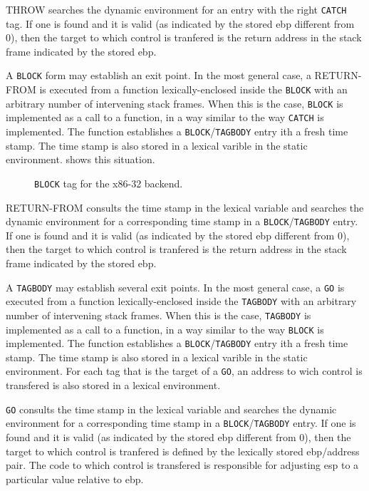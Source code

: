 THROW searches the dynamic environment for an entry with the right
\texttt{CATCH} tag.  If one is found and it is valid (as indicated by
the stored ebp different from 0), then the target to which control is
tranfered is the return address in the stack frame indicated by the
stored ebp.

A \texttt{BLOCK} form may establish an exit point.  In the most
general case, a RETURN-FROM is executed from a function
lexically-enclosed inside the \texttt{BLOCK} with an arbitrary number
of intervening stack frames.  When this is the case, \texttt{BLOCK} is
implemented as a call to a function, in a way similar to the way
\texttt{CATCH} is implemented.  The function establishes a
\texttt{BLOCK}/\texttt{TAGBODY} entry ith a fresh time stamp.  The
time stamp is also stored in a lexical varible in the static
environment.   shows this situation. 

\begin{figure}
\begin{center}
\end{center}
\caption{\label{fig-x86-32-block-tag}
\texttt{BLOCK} tag for the x86-32 backend.}
\end{figure}

RETURN-FROM consults the time stamp in the lexical variable and
searches the dynamic environment for a corresponding time stamp in a
\texttt{BLOCK}/\texttt{TAGBODY} entry.  If one is found and it is
valid (as indicated by the stored ebp different from 0), then the
target to which control is tranfered is the return address in the
stack frame indicated by the stored ebp.

A \texttt{TAGBODY} may establish several exit points.  In the most
general case, a \texttt{GO} is executed from a function
lexically-enclosed inside the \texttt{TAGBODY} with an arbitrary
number of intervening stack frames.  When this is the case,
\texttt{TAGBODY} is implemented as a call to a function, in a way
similar to the way \texttt{BLOCK} is implemented.  The function
establishes a \texttt{BLOCK}/\texttt{TAGBODY} entry ith a fresh time
stamp.  The time stamp is also stored in a lexical varible in the
static environment.  For each tag that is the target of a \texttt{GO},
an address to wich control is transfered is also stored in a lexical
environment.

\texttt{GO} consults the time stamp in the lexical variable and
searches the dynamic environment for a corresponding time stamp in a
\texttt{BLOCK}/\texttt{TAGBODY} entry.  If one is found and it is
valid (as indicated by the stored ebp different from 0), then the
target to which control is tranfered is defined by the lexically
stored ebp/address pair.  The code to which control is transfered is
responsible for adjusting esp to a particular value relative to ebp.

